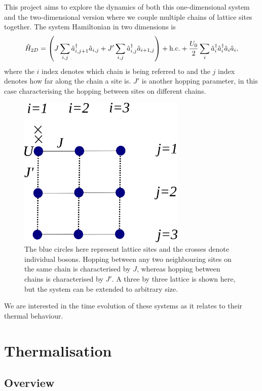 \documentclass[a4paper, 10pt]{article}
\theoremstyle{plain}
\begin{document}
This project aims to explore the dynamics of both this one-dimensional system
and the two-dimensional version where we couple multiple chains of lattice
sites together. The system Hamiltonian in two dimensions is
\begin{equation}
    \hat{H}_{2D}
    =
    \left (
        J \sum_{i,j}{\hat{a}^{\dagger}_{i,j+1} \hat{a}_{i,j}} +
        J'\sum_{i,j}{\hat{a}^{\dagger}_{i,j} \hat{a}_{i+1,j}}
    \right) +
    \text{\text{h.c.}} +
    \frac{U_{0}}{2}
    \sum_{i}{\hat{a}^{\dagger}_{i}\hat{a}^{\dagger}_{i} \hat{a}_{i}\hat{a}_{i}},
\end{equation}
where the $i$ index denotes which chain is being referred to and the $j$ index
denotes how far along the chain a site is. $J'$ is another hopping parameter,
in this case characterising the hopping between sites on different chains.
\begin{figure}[H]
    \begin{center}
        \includegraphics[width=8cm]{lattice_pic}
    \end{center}
    \caption{The blue circles here represent lattice sites and the crosses
             denote individual bosons. Hopping between any two neighbouring
             sites on the same chain is characterised by $J$, whereas hopping
             between chains is characterised by $J'$. A three by three lattice
             is shown here, but the system can be extended to arbitrary size.
            }
\end{figure}
We are interested in the time evolution of these systems as it relates to their
thermal behaviour.


\section{Thermalisation}

\subsection{Overview}
\end{document}
